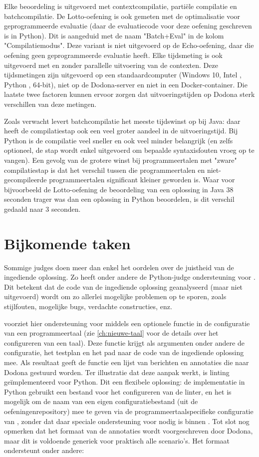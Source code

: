 Elke beoordeling is uitgevoerd met contextcompilatie, partiële compilatie en batchcompilatie.
De Lotto-oefening is ook gemeten met de optimalisatie voor geprogrammeerde evaluatie (daar de evaluatiecode voor deze oefening geschreven is in Python).
Dit is aangeduid met de naam "Batch+Eval" in de kolom "Compilatiemodus".
Deze variant is niet uitgevoerd op de Echo-oefening, daar die oefening geen geprogrammeerde evaluatie heeft.
Elke tijdsmeting is ook uitgevoerd met en zonder parallelle uitvoering van de contexten.
Deze tijdsmetingen zijn uitgevoerd op een standaardcomputer (Windows 10, Intel , Python , 64-bit), niet op de Dodona-server en niet in een Docker-container.
Die laatste twee factoren kunnen ervoor zorgen dat uitvoeringstijden op Dodona sterk verschillen van deze metingen.

Zoals verwacht levert batchcompilatie het meeste tijdswinst op bij Java: daar heeft de compilatiestap ook een veel groter aandeel in de uitvoeringstijd.
Bij Python is de compilatie veel sneller en ook veel minder belangrijk (en zelfs optioneel, de stap wordt enkel uitgevoerd om bepaalde syntaxisfouten vroeg op te vangen).
Een gevolg van de grotere winst bij programmeertalen met "zware" compilatiestap is dat het verschil tussen die programmeertalen en niet-gecompileerde programmeertalen significant kleiner geworden is.
Waar voor bijvoorbeeld de Lotto-oefening de beoordeling van een oplossing in Java 38 seconden trager was dan een oplossing in Python beoordelen, is dit verschil gedaald naar 3 seconden.

\section{Bijkomende taken}\label{sec:andere-taken}

Sommige judges doen meer dan enkel het oordelen over de juistheid van de ingediende oplossing.
Zo heeft onder andere de Python-judge ondersteuning voor .
Dit betekent dat de code van de ingediende oplossing geanalyseerd (maar niet uitgevoerd) wordt om zo allerlei mogelijke problemen op te sporen, zoals stijlfouten, mogelijke bugs, verdachte constructies, enz.

\tested{} voorziet hier ondersteuning voor middels een optionele functie in de configuratie van een programmeertaal (zie \cref{ch:nieuwe-taal} voor de details over het configureren van een taal).
Deze functie krijgt als argumenten onder andere de configuratie, het testplan en het pad naar de code van de ingediende oplossing mee.
Als resultaat geeft de functie een lijst van berichten en annotaties die naar Dodona gestuurd worden.
Ter illustratie dat deze aanpak werkt, is linting geïmplementeerd voor Python.
Dit een flexibele oplossing: de implementatie in Python gebruikt een bestand voor het configureren van de linter, en het is mogelijk om de naam van een eigen configuratiebestand (uit de oefeningenrepository) mee te geven via de programmeertaalspecifieke configuratie van \tested{}, zonder dat daar speciale ondersteuning voor nodig is binnen \tested{}.
Tot slot nog opmerken dat het formaat van de annotaties wordt voorgeschreven door Dodona, maar dit is voldoende generiek voor praktisch alle scenario's.
Het formaat ondersteunt onder andere:


